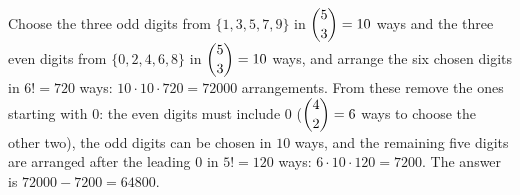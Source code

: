 Choose the three odd digits from $\{1,3,5,7,9\}$ in $\dbinom53=10$ ways and the three even digits from $\{0,2,4,6,8\}$ in $\dbinom53=10$ ways, and arrange the six chosen digits in $6!=720$ ways: $10\cdot10\cdot720=72000$ arrangements. From these remove the ones starting with $0$: the even digits must include $0$ ($\dbinom42=6$ ways to choose the other two), the odd digits can be chosen in $10$ ways, and the remaining five digits are arranged after the leading $0$ in $5!=120$ ways: $6\cdot10\cdot120=7200$. The answer is $72000-7200=\boxed{64800}$.
